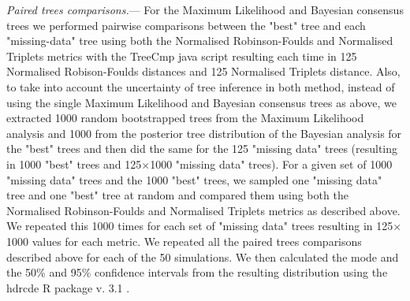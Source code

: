 \documentclass[12pt,letterpaper]{article}
\renewcommand{\subsubsection}[1]{%
\vspace{2ex}
\noindent
\textit{#1.}---}
\begin{document}
\subsubsection{Paired trees comparisons} %
\label{tree_comparisons}
For the Maximum Likelihood and Bayesian consensus
trees we performed pairwise comparisons between the "best" tree and each "missing-data" tree using both the Normalised Robinson-Foulds and Normalised Triplets metrics with the TreeCmp java script \citep{Bogdanowicz2012} resulting each time in 125 Normalised Robison-Foulds distances and 125 Normalised Triplets distance. %
Also, to take into account the uncertainty of tree inference in both method, instead of using the single Maximum Likelihood and Bayesian consensus trees as above, we extracted 1000 random bootstrapped trees from the Maximum Likelihood analysis and 1000 from the posterior tree distribution of the Bayesian analysis for the "best" trees and then did the same for the 125 "missing data" trees (resulting in 1000 "best" trees and 125$\times$1000 "missing data" trees). 
For a given set of 1000 "missing data" trees and the 1000 "best" trees, we sampled one "missing data" tree and one "best" tree at random and compared them using both the Normalised Robinson-Foulds and Normalised Triplets metrics as described above. We repeated this 1000 times for each set of "missing data" trees resulting in 125$\times$1000 values for each metric. We repeated all the paired trees comparisons described above for each of the 50 simulations. We then calculated the mode and the 50\% and 95\% confidence intervals from the resulting distribution using the hdrcde R package v. 3.1 \citep{hdrcde}. %
\end{document}

